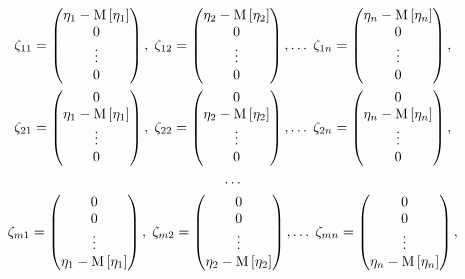 \begin{gather*}
	\zeta_{11}
	=
	\begin{pmatrix}
		\eta_1 - \mathrm{M} \left [ \eta_1 \right ] \\
		0 \\
		\vdots \\
		0
	\end{pmatrix}
	, \;
	\zeta_{12}
	=
	\begin{pmatrix}
		\eta_2 - \mathrm{M} \left [ \eta_2 \right ] \\
		0 \\
		\vdots \\
		0
	\end{pmatrix}
	, \dots \;
	\zeta_{1n}
	=
	\begin{pmatrix}
		\eta_n - \mathrm{M} \left [ \eta_n \right ] \\
		0 \\
		\vdots \\
		0
	\end{pmatrix}
	, \\
	\zeta_{21}
	=
	\begin{pmatrix}
		0 \\
		\eta_1 - \mathrm{M} \left [ \eta_1 \right ] \\
		\vdots \\
		0
	\end{pmatrix}
	, \;
	\zeta_{22}
	=
	\begin{pmatrix}
		0 \\
		\eta_2 - \mathrm{M} \left [ \eta_2 \right ] \\
		\vdots \\
		0
	\end{pmatrix}
	, \dots \;
	\zeta_{2n}
	=
	\begin{pmatrix}
		0 \\
		\eta_n - \mathrm{M} \left [ \eta_n \right ] \\
		\vdots \\
		0
	\end{pmatrix}
	, \\
	\dots \\
	\zeta_{m1}
	=
	\begin{pmatrix}
		0 \\
		0 \\
		\vdots \\
		\eta_1 - \mathrm{M} \left [ \eta_1 \right ]
	\end{pmatrix}
	, \;
	\zeta_{m2}
	=
	\begin{pmatrix}
		0 \\
		0 \\
		\vdots \\
		\eta_2 - \mathrm{M} \left [ \eta_2 \right ]
	\end{pmatrix}
	, \dots \;
	\zeta_{mn}
	=
	\begin{pmatrix}
		0 \\
		0 \\
		\vdots \\
		\eta_n - \mathrm{M} \left [ \eta_n \right ]
	\end{pmatrix}
	,
\end{gather*}
